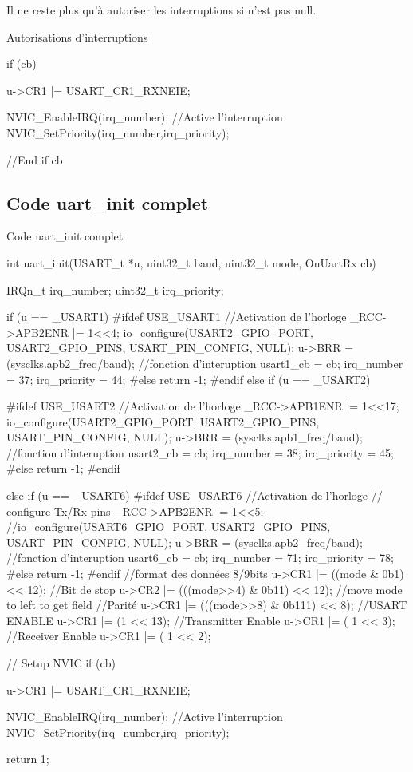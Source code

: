 Il ne reste plus qu'à autoriser les interruptions si  n'est pas null.

\begin{Cpp}{Autorisations d'interruptions}

if (cb) {
			
	u->CR1 |= USART_CR1_RXNEIE;

	NVIC_EnableIRQ(irq_number); //Active l'interruption
	NVIC_SetPriority(irq_number,irq_priority);
}//End if cb

\end{Cpp}

\subsection{Code uart\_init complet}

\begin{Cpp}{Code uart\_init complet}

int uart_init(USART_t *u, uint32_t baud, uint32_t mode, OnUartRx cb)
{
	IRQn_t	irq_number;
	uint32_t irq_priority;

	if (u == _USART1) {
#ifdef USE_USART1
		//Activation de l'horloge
		_RCC->APB2ENR |= 1<<4;
		io_configure(USART2_GPIO_PORT, USART2_GPIO_PINS, USART_PIN_CONFIG, NULL);
		u->BRR = (sysclks.apb2_freq/baud);
		//fonction d'interuption
		usart1_cb = cb;
		irq_number = 37;
		irq_priority = 44;
#else
	return -1;
#endif
	 } 
	 else if (u == _USART2) {
#ifdef USE_USART2
		//Activation de l'horloge
		_RCC->APB1ENR |= 1<<17;
		io_configure(USART2_GPIO_PORT, USART2_GPIO_PINS, USART_PIN_CONFIG, NULL);
		u->BRR = (sysclks.apb1_freq/baud);
		//fonction d'interuption
		usart2_cb = cb;
		irq_number = 38;
		irq_priority = 45;
#else
	return -1;
#endif

	} else if (u == _USART6) {
#ifdef USE_USART6
		//Activation de l'horloge
		// configure Tx/Rx pins
		_RCC->APB2ENR |= 1<<5;
		//io_configure(USART6_GPIO_PORT, USART2_GPIO_PINS, USART_PIN_CONFIG, NULL);
		u->BRR = (sysclks.apb2_freq/baud);
		//fonction d'interuption
		usart6_cb = cb;
		irq_number = 71;
		irq_priority = 78;
#else
	return -1;
#endif
	}
		//format des données 8/9bits
		u->CR1 |= ((mode & 0b1) << 12);
		//Bit de stop
		u->CR2 |= (((mode>>4) & 0b11) << 12); //move mode to left to get field
		//Parité
		u->CR1 |= (((mode>>8) & 0b111) << 8);
		//USART ENABLE
		u->CR1 |=	(1 << 13);
		//Transmitter Enable
		u->CR1 |=	( 1 << 3);
		//Receiver Enable
		u->CR1 |=	( 1 << 2);
 
	// Setup NVIC
	if (cb) {
			
		u->CR1 |= USART_CR1_RXNEIE;

		NVIC_EnableIRQ(irq_number); //Active l'interruption
		NVIC_SetPriority(irq_number,irq_priority);

	}
    return 1;
}

\end{Cpp}
	

